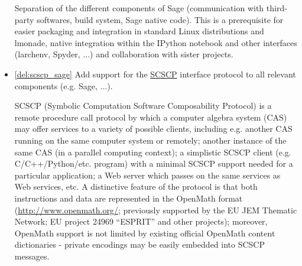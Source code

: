 \begin{Workpackage}{\thewpno}
\begin{WPDeliverables}
\begin{itemize}
      Separation of the different components of Sage (communication with
      third-party softwares, build system, Sage native code). This is a
      prerequisite for easier packaging and integration in standard Linux
      distributions and lmonade, native integration within the IPython
      notebook and other interfaces (larchenv, Spyder, ...) and
      collaboration with sister projects.



    \item \ref{del:scscp_sage} Add support for the
      \href{http://www.symbolic-computing.org/}{SCSCP} interface protocol
      to all relevant components (e.g. Sage, ...).
        
        SCSCP (Symbolic Computation Software Composability Protocol) is a 
        remote procedure call protocol by which a computer algebra system (CAS) 
        may offer services to a variety of possible clients, including e.g. 
        another CAS running on the same computer system or remotely; 
        another instance of the same CAS (in a parallel computing context);
        a simplistic SCSCP client (e.g. C/C++/Python/etc. program) with a 
        minimal SCSCP support needed for a particular application; 
        a Web server which passes on the same services as Web services, etc.
        A distinctive feature of the protocol is that both instructions and data
        are represented in the OpenMath format (\url{http://www.openmath.org/};
        previously supported by the EU JEM Thematic Network; EU project 24969 ``ESPRIT''
        and other projects); moreover, OpenMath support is not limited by 
        existing official OpenMath content dictionaries - private encodings may 
        be easily embedded into SCSCP messages.
        

\end{itemize}
\end{WPDeliverables}
\end{Workpackage}
